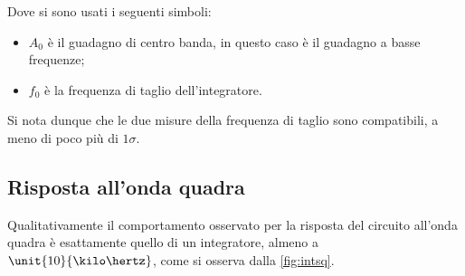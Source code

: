 \documentclass[10pt,a4paper]{article}
\begin{document}
\noindent Dove si sono usati i seguenti simboli:
\begin{itemize}
\item $A_0$ è il guadagno di centro banda, in questo caso è il guadagno a basse frequenze;
\item $f_0$ è la frequenza di taglio dell'integratore.
\end{itemize}

Si nota dunque che le due misure della frequenza di taglio sono compatibili, a meno di poco più di $1\sigma$.

\subsection{Risposta all'onda quadra}

Qualitativamente il comportamento osservato per la risposta del circuito all'onda quadra è esattamente quello di un integratore, almeno a $\unit{10}{\kilo\hertz}$, come si osserva dalla \figurename{\ref{fig:intsq}}.
\end{document}
